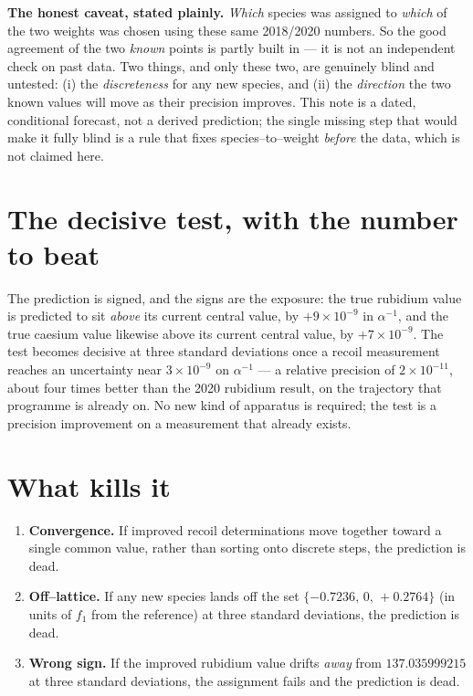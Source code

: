 \documentclass[11pt]{article}
\begin{document}
\medskip\noindent\textbf{The honest caveat, stated plainly.} \emph{Which} species
was assigned to \emph{which} of the two weights was chosen using these same
2018/2020 numbers. So the good agreement of the two \emph{known} points is partly
built in --- it is not an independent check on past data. Two things, and only
these two, are genuinely blind and untested: (i) the \emph{discreteness} for any
new species, and (ii) the \emph{direction} the two known values will move as their
precision improves. This note is a dated, conditional forecast, not a derived
prediction; the single missing step that would make it fully blind is a rule that
fixes species--to--weight \emph{before} the data, which is not claimed here.

\section{The decisive test, with the number to beat}

The prediction is signed, and the signs are the exposure: the true rubidium value
is predicted to sit \emph{above} its current central value, by $+9\times10^{-9}$
in $\alpha^{-1}$, and the true caesium value likewise above its current central
value, by $+7\times10^{-9}$. The test becomes decisive at three standard
deviations once a recoil measurement reaches an uncertainty near
$3\times10^{-9}$ on $\alpha^{-1}$ --- a relative precision of $2\times10^{-11}$,
about four times better than the 2020 rubidium result, on the trajectory that
programme is already on. No new kind of apparatus is required; the test is a
precision improvement on a measurement that already exists.

\section{What kills it}

\begin{enumerate}[leftmargin=1.6em,itemsep=3pt]
\item \textbf{Convergence.} If improved recoil determinations move together toward
a single common value, rather than sorting onto discrete steps, the prediction is
dead.
\item \textbf{Off--lattice.} If any new species lands off the set
$\{-0.7236,\,0,\,+0.2764\}$ (in units of $f_1$ from the reference) at three
standard deviations, the prediction is dead.
\item \textbf{Wrong sign.} If the improved rubidium value drifts \emph{away} from
$137.035999215$ at three standard deviations, the assignment fails and the
prediction is dead.
\end{enumerate}
\end{document}

